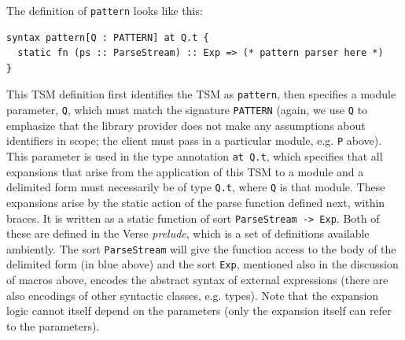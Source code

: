 The definition of \lstinline{pattern} looks like this:
\begin{lstlisting}[numbers=none]
syntax pattern[Q : PATTERN] at Q.t {
  static fn (ps :: ParseStream) :: Exp => (* pattern parser here *)
}
\end{lstlisting}
This TSM definition first identifies the TSM as \lstinline{pattern}, then specifies a module parameter, \lstinline{Q}, which must match the signature \lstinline{PATTERN} (again, we use \lstinline{Q} to emphasize that the library provider does not make any assumptions about identifiers in scope; the client must pass in a particular module, e.g. \lstinline{P} above). This parameter is used in the type annotation \lstinline{at Q.t}, which specifies that all expansions that arise from the application of this TSM to a module and a delimited form must necessarily be of type \lstinline{Q.t}, where \lstinline{Q} is that module. These expansions arise by the static action of the parse function defined next, within braces. It is written as a static function of sort \lstinline{ParseStream -> Exp}. Both of these are defined in the Verse \emph{prelude}, which is a set of definitions available ambiently. The sort \lstinline{ParseStream} will give the function access to the {body} of the delimited form (in blue above) and the sort \lstinline{Exp}, mentioned also in the discussion of macros above,  encodes the abstract syntax of external expressions (there are also encodings of other syntactic classes, e.g. types). Note that the expansion logic cannot itself depend on the parameters (only the expansion itself can refer to the parameters). %

